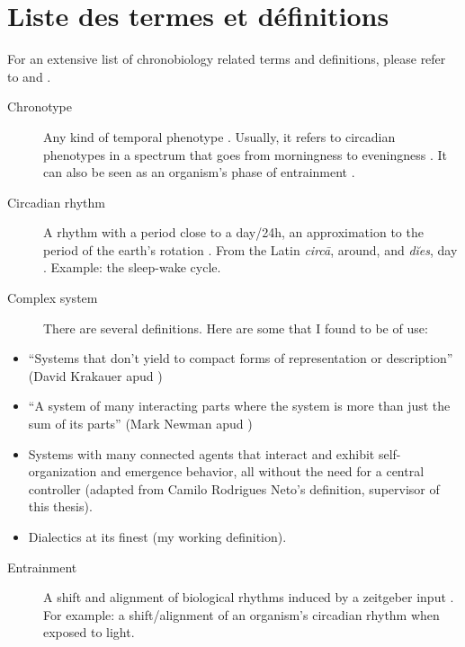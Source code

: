 \documentclass[
12pt,
openright,
oneside,
a4paper,
chapter=TITLE,
section=TITLE,
french,
spanish,
brazil,
english
]{abntex2}\usepackage{array}
\makeatletter
\newlength{\hugeskipamount}
\newcommand{\listadetermosname}{Lista de termos e definições}
\renewcommand{\listadetermosname}{List of terms and definitions}
\renewcommand{\listadetermosname}{Lista de termos e definições}
\renewcommand{\listadetermosname}{Lista de términos y definiciones}
\renewcommand{\listadetermosname}{Liste des termes et définitions}
\renewcommand{\pretextualchapter}[1]{
  \setlength{\afterchapskip}{\hugeskipamount}
  \addtocounter{abntex@bookmarkcounter}{1}
  \PRIVATEbookmarkthis{#1}
  \chapter*[#1]{#1}
}
\newenvironment{termos}{%
  \pretextualchapter{\listadetermosname}
}{
  \cleardoublepage
}
\theoremstyle{plain}
\theoremstyle{remark}
\makeatother
\begin{document}
\begin{termos}

For an extensive list of chronobiology related terms and definitions,
please refer to \textcite{aschoff1965} and \textcite{marques2012}.

\begin{description}
\item[Chronotype]
\hspace{20cm}

Any kind of temporal phenotype \autocite{ehret1974,pittendrigh1993}.
Usually, it refers to circadian phenotypes in a spectrum that goes from
morningness to eveningness \autocite{roenneberg2003}. It can also be
seen as an organism's phase of entrainment \autocite{roenneberg2012a}.
\item[Circadian rhythm]
\hspace{20cm}

A rhythm with a period close to a day/24h, an approximation to the
period of the earth's rotation \autocite{pittendrigh1960}. From the
Latin \emph{circā}, around, and \emph{dĭes}, day \autocite{latinitium}.
Example: the sleep-wake cycle.
\item[Complex system]
\hspace{20cm}

There are several definitions. Here are some that I found to be of use:
\end{description}

\begin{itemize}
\tightlist
\item
  ``Systems that don't yield to compact forms of representation or
  description'' (David Krakauer apud \textcite{mitchell2013})
\item
  ``A system of many interacting parts where the system is more than
  just the sum of its parts'' (Mark Newman apud \textcite{mitchell2013})
\item
  Systems with many connected agents that interact and exhibit
  self-organization and emergence behavior, all without the need for a
  central controller (adapted from Camilo Rodrigues Neto's definition,
  supervisor of this thesis).
\item
  Dialectics at its finest (my working definition).
\end{itemize}

\begin{description}
\item[Entrainment]
\hspace{20cm}

A shift and alignment of biological rhythms induced by a zeitgeber input
\autocite{kuhlman2018}. For example: a shift/alignment of an organism's
circadian rhythm when exposed to light.
\end{description}

\end{termos}
\end{document}
